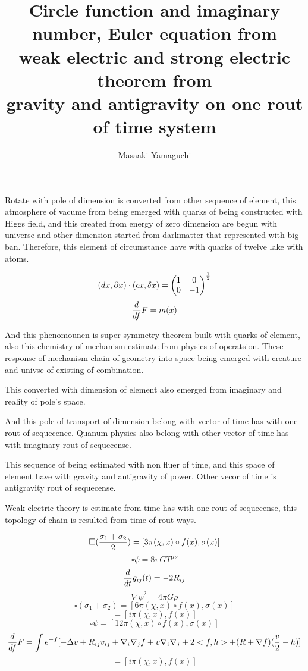 \documentclass{jsarticle}
\begin{document}
{\newpage
\title{Circle function and imaginary number, Euler equation from \\
        weak electric and strong electric theorem from \\
	gravity and antigravity on one rout of time system}
\author{Masaaki Yamaguchi}

 Rotate with pole of dimension is converted from other sequence of element,  
this atmosphere of vacume from being emerged with quarks of being constructed
with Higgs field, and this created from energy of zero dimension are begun with
universe and other dimension started from darkmatter that represented with 
big-ban.
Therefore, this element of circumstance have with quarks of twelve lake with
atoms.

  $$ (dx, \partial x)\cdot (\epsilon x, \delta x) = \begin{pmatrix}
	  1 & 0 \\
  0 & - 1 \end{pmatrix}^{1 \over 2}  $$
  $$ {d \over df} F = m(x) $$

 And this phenomounen is super symmetry theorem built with quarks of element, 
also this chemistry of mechanism estimate from physics of operatsion.
These response of mechanism chain of geometry into space being emerged with
creature and univse of existing of combination.

  This converted with dimension of element also emerged from imaginary and 
reality of pole's space.

  And this pole of transport of dimension belong with vector of time has 
with one rout of sequecence. Quanum physics also belong with other vector 
of time has with imaginary rout of sequecense.

 This sequence of being estimated with non fluer of time, and this space 
of element have with gravity and antigravity of power.
Other vecor of time is antigravity rout of sequecense.

 Weak electric theory is estimate from time has with one rout of sequecense,
this topology of chain is resulted from time of rout ways.


   $$ \square ({{\sigma_1 + \sigma_2} \over 2 }) = [3 \pi (\chi,x) \circ f(x),
   \sigma(x)] $$
   $$ \square \psi = 8 \pi G T^{\mu\nu} $$
   $$ {d \over dt}g_{ij}(t) = - 2 R_{ij} $$
   $$ \nabla \psi^2 = 4 \pi G \rho $$
   $$ \square (\sigma_1 + \sigma_2) = [6\pi(\chi,x)\circ f(x), \sigma(x)] $$
   $$ = [i \pi(\chi,x),f(x)] $$
   $$ \square \psi = [12 \pi (\chi,x)\circ f(x), \sigma(x)] $$
   $$ {d \over df} F = \int e^{-f}[- \Delta v + R_{ij} v_{ij}+ 
   \nabla_i \nabla_j f  + v \nabla_i \nabla_j + 2<f,h> + (R + \nabla f)
   ({v \over 2} - h) ] $$
   $$ =[i \pi(\chi,x), f(x)] $$

}
\end{document}
